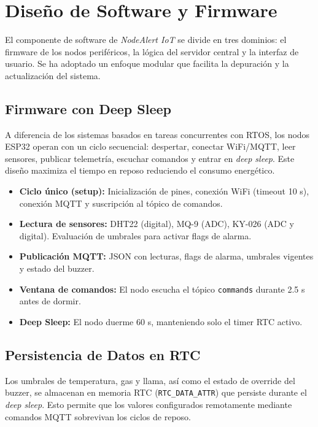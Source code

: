 \documentclass[11pt,a4paper]{article}
\begin{document}
\section{Diseño de Software y Firmware}

El componente de software de \textit{NodeAlert IoT} se divide en tres dominios: el firmware de los nodos periféricos, la lógica del servidor central y la interfaz de usuario. Se ha adoptado un enfoque modular que facilita la depuración y la actualización del sistema.

\subsection{Firmware con Deep Sleep}
A diferencia de los sistemas basados en tareas concurrentes con RTOS, los nodos ESP32 operan con un ciclo secuencial: despertar, conectar WiFi/MQTT, leer sensores, publicar telemetría, escuchar comandos y entrar en \textit{deep sleep}. Este diseño maximiza el tiempo en reposo reduciendo el consumo energético.

\begin{itemize}
    \item \textbf{Ciclo \'unico (setup):} Inicialización de pines, conexión WiFi (timeout 10 s), conexión MQTT y suscripción al tópico de comandos.
    \item \textbf{Lectura de sensores:} DHT22 (digital), MQ-9 (ADC), KY-026 (ADC y digital). Evaluación de umbrales para activar flags de alarma.
    \item \textbf{Publicación MQTT:} JSON con lecturas, flags de alarma, umbrales vigentes y estado del buzzer.
    \item \textbf{Ventana de comandos:} El nodo escucha el tópico \texttt{commands} durante 2.5 s antes de dormir.
    \item \textbf{Deep Sleep:} El nodo duerme 60 s, manteniendo solo el timer RTC activo.
\end{itemize}

\subsection{Persistencia de Datos en RTC}
Los umbrales de temperatura, gas y llama, así como el estado de override del buzzer, se almacenan en memoria RTC (\texttt{RTC\_DATA\_ATTR}) que persiste durante el \textit{deep sleep}. Esto permite que los valores configurados remotamente mediante comandos MQTT sobrevivan los ciclos de reposo.
\end{document}
